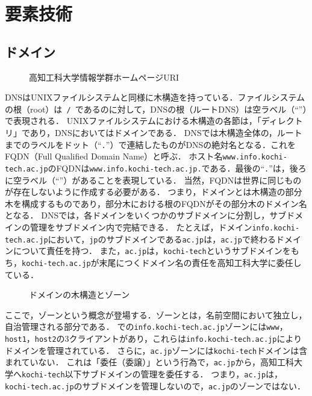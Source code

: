 \section{要素技術}
\subsection{ドメイン}\label{chap:domain}
\newcommand{\popt}{\texttt{POP3}}
\begin{wrapfigure}{r}[0mm]{.55\textwidth}
    \vspace{-1.5cm}
    \centering
    
    \vspace{1em}
    \caption{高知工科大学情報学群ホームページURI}
    \vspace{-.5cm}
\end{wrapfigure}
DNSはUNIXファイルシステムと同様に木構造を持っている．ファイルシステムの根（root）は\texttt{\ /\ }であるのに対して，DNSの根（ルートDNS）は空ラベル（``''）で表現される．
UNIXファイルシステムにおける木構造の各節は，「ディレクトリ」であり，DNSにおいてはドメインである．
DNSでは木構造全体の，ルートまでのラベルをドット（``\texttt{.}''）で連結したものがDNSの絶対名となる．これをFQDN（Full Qualified Domain Name）と呼ぶ．
ホスト名\texttt{www.info.kochi-tech.ac.jp}のFQDNは\texttt{www.info.kochi-tech.ac.jp.}である．最後の``\texttt{.}''は，後ろに空ラベル（``''）があることを表現している．
当然，FQDNは世界に同じものが存在しないように作成する必要がある．
つまり，ドメインとは木構造の部分木を構成するものであり，部分木における根のFQDNがその部分木のドメイン名となる．
DNSでは，各ドメインをいくつかのサブドメインに分割し，サブドメインの管理をサブドメイン内で完結できる．
たとえば，ドメイン\texttt{info.kochi-tech.ac.jp}において，\texttt{jp}のサブドメインである\texttt{ac.jp}は，\texttt{ac.jp}で終わるドメインについて責任を持つ．
また，\texttt{ac.jp}は，\texttt{kochi-tech}というサブドメインをもち，\texttt{kochi-tech.ac.jp}が末尾につくドメイン名の責任を高知工科大学に委任している．

\begin{wrapfigure}{r}[0mm]{.62\textwidth}
    \centering
    
    \caption{ドメインの木構造とゾーン}
    \label{fig:ドメインの木構造とゾーン}
    \vspace{-1cm}
\end{wrapfigure}
ここで，ゾーンという概念が登場する．ゾーンとは，名前空間において独立し，自治管理される部分である．
での\texttt{info.kochi-tech.ac.jp}ゾーンには\texttt{www}，\texttt{host1}，\texttt{host2}の3クライアントがあり，これらは\texttt{info.kochi-tech.ac.jp}によりドメインを管理されている．
さらに，\texttt{ac.jp}ゾーンには\texttt{kochi-tech}ドメインは含まれていない．
これは「委任（委譲）」という行為で，\texttt{ac.jp}から，高知工科大学へ\texttt{kochi-tech}以下サブドメインの管理を委任する．
つまり，\texttt{ac.jp}は，\texttt{kochi-tech.ac.jp}のサブドメインを管理しないので，\texttt{ac.jp}のゾーンではない．
\hfill\cite[p.23]{DNSBIND}
